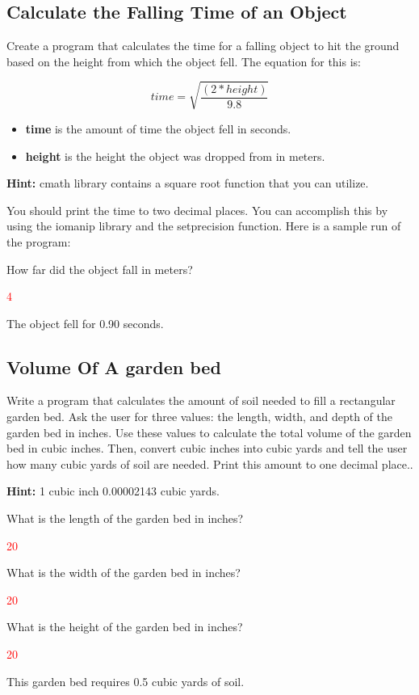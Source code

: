 \subsection{Calculate the Falling Time of an Object}

Create a program that calculates the time for a falling object to hit the ground based on the height from which the object fell. The equation for this is:

$$time = \sqrt{\frac{(2*height)}{9.8}}$$

\begin{itemize}
    \item \textbf{time} is the amount of time the object fell in seconds.
    \item \textbf{height} is the height the object was dropped from in meters.
\end{itemize}

\textbf{Hint:} cmath library contains a square root function that you can utilize. 

You should print the time to two decimal places. You can accomplish this by using the iomanip library and the setprecision function. Here is a sample run of the program:

\begin{sample}
How far did the object fall in meters?

\textcolor{red}{4}

The object fell for 0.90 seconds.
\end{sample}

\subsection{Volume Of A garden bed}
Write a program that calculates the amount of soil needed to fill a rectangular garden bed. Ask the user for three values: the length, width, and depth of the garden bed in inches. Use these values to calculate the total volume of the garden bed in cubic inches. Then, convert cubic inches into cubic yards and tell the user how many cubic yards of soil are needed. Print this amount to one decimal place..

\textbf{Hint:} 1 cubic inch 0.00002143 cubic yards.


\begin{sample}
What is the length of the garden bed in inches?

\textcolor{red}{20}

What is the width of the garden bed in inches?

\textcolor{red}{20}

What is the height of the garden bed in inches?

\textcolor{red}{20}

This garden bed requires 0.5 cubic yards of soil.

\end{sample}

